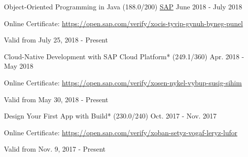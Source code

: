 

\begin{cventries}

  \cventry
    {Object-Oriented Programming in Java (188.0/200)} %
    {\href{https://www.sap.com/index.html}{SAP}} %
    {} %
    {June 2018 - July 2018} %
    {
	    \begin{cvitems} %
        \item {Online Certificate: \url{https://open.sap.com/verify/xocis-tyvip-gynuh-byneg-punel}} %
        \item {Valid from July 25, 2018 - Present} %
      \end{cvitems}
    }   
    
  \cventry
    {Cloud-Native Development with SAP Cloud Platform* (249.1/360)} %
    {} %
    {} %
    {Apr. 2018 - May 2018} %
    {
	    \begin{cvitems} %
        \item {Online Certificate: \url{https://open.sap.com/verify/xosen-nykel-vybup-susig-sihim}} %
        \item {Valid from May 30, 2018 - Present} %
      \end{cvitems}
    }   

  \cventry
    {Design Your First App with Build* (230.0/240)} %
    {} %
    {} %
    {Oct. 2017 - Nov. 2017} %
    {
	    \begin{cvitems} %
        \item {Online Certificate: \url{https://open.sap.com/verify/xoban-setyz-vogaf-leryz-lufor}} %
        \item {Valid from Nov. 9, 2017 - Present} %
      \end{cvitems}
    }      
	  

\end{cventries}
